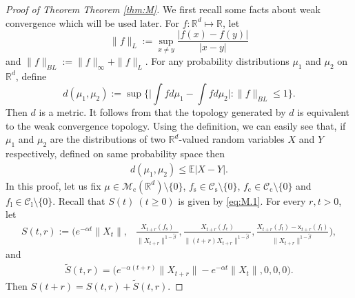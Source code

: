 \documentclass[12pt,a4paper]{amsart}
\theoremstyle{plain}
\theoremstyle{definition}
\numberwithin{equation}{section}
\begin{document}
\begin{proof}[Proof of Theorem Theorem \ref{thm:M}]
 We first recall some facts about weak convergence which will be used later. For $f:\mathbb R^d\mapsto \mathbb R$, let
 $$
 \|f\|_L:=\sup_{x\neq y}\frac{|f(x)-f(y)|}{|x-y|}
 $$
 and $\|f\|_{BL}:= \|f\|_{\infty}+\|f\|_L. $
 For any probability distributions $\mu_1$ and $\mu_2$ on $\mathbb R^d$, define
\[
  d(\mu_1,\mu_2):=\sup\Big\{\Big|\int fd\mu_1-\int f d\mu_2\Big|:\|f\|_{BL}\leq 1\Big\}.
\]
Then $d$ is a metric. It follows from \cite[Theorem 11.3.3]{Dudley2002} that the topology generated by $d$ is equivalent to the weak convergence topology.
Using the definition, we can easily see that, if $\mu_1$ and $\mu_2$ are the distributions of two $\mathbb R^d $-valued random variables $X$ and $Y$ respectively,
defined on same probability space then
\begin{align}\label{ineq: distribution control}
  d(\mu_1,\mu_2) \leq \mathbb E|X-Y|.
\end{align}
In this proof, let us fix $\mu\in \mathcal M_\mathrm c(\mathbb R^d)\setminus \{0\}$, $f_\mathrm s\in \mathcal C_\mathrm s\setminus\{0\}$, $f_\mathrm c \in \mathcal C_\mathrm c\setminus\{0\}$ and $f_\mathrm l \in \mathcal C_\mathrm l\setminus\{0\}$.
Recall that $S(t)~(t\geq 0)$ is given by \eqref{eq:M.1}.
For every $r,t> 0$, let
\begin{align}
S(t,r):=\Big(e^{-\alpha t}\|X_t\|,& \frac{X_{t+r}(f_\mathrm s)}{\|X_{t+r}\|^{1-\tilde{\beta}}}, \frac{X_{t+r}(f_\mathrm c)}{\|(t+r)X_{t+r}\|^{1-\tilde{\beta}}}, \frac{X_{t+r}(f_\mathrm l)-\mathrm x_{t+r}(f_\mathrm l) }{\|X_{t+r}\|^{1-\tilde{\beta}}}\Big),
\end{align}
and
\begin{align}
\widetilde{S}(t,r)= \Big(e^{-\alpha (t+r)}\|X_{t+r}\|-e^{-\alpha t}\|X_t\|,0,0,0\Big).
\end{align}
Then $S(t+r)=S(t,r)+\widetilde{S}(t,r)$.
%

\end{proof}
\end{document}
